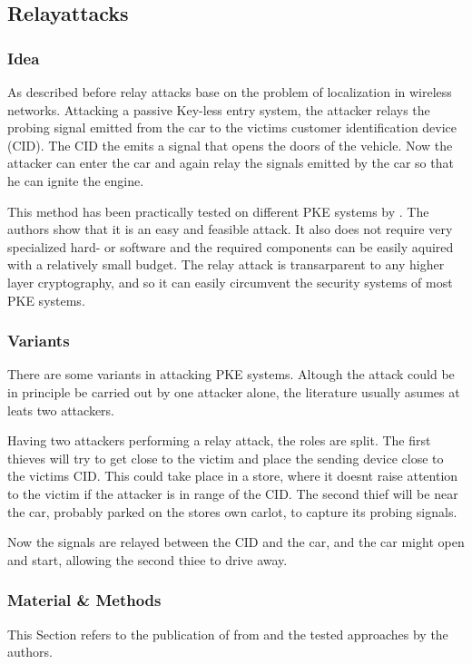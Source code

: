 
\subsection{Relayattacks}
\subsubsection*{Idea}
	As described before relay attacks base on the problem of localization in
	wireless networks.
	Attacking a passive Key-less entry system,
	the attacker relays the probing signal emitted from the car to the victims
	customer identification device (CID).
	The CID the emits a signal that opens the doors of the vehicle.
	Now the attacker can enter the car and again relay the signals emitted by the
	car so that he can ignite the engine.
	
	This method has been practically tested on different PKE systems by \cite{relayAttacksFranc}. %
	The authors show that it is an easy and feasible attack.
	It also does not require very specialized hard- or software and
	the required components can be easily aquired with a relatively small budget.
	The relay attack is transarparent to any higher layer cryptography,	%
	and so it can easily circumvent the security systems of most PKE systems.

\subsubsection*{Variants}
	There are some variants in attacking PKE systems.
	Altough the attack could be in principle be carried out by one attacker alone,
	the literature usually asumes at leats two attackers.

	\label{par:twoThieves}
	Having two attackers performing a relay attack,
	the roles are split.
	The first thieves will try to get close to the victim and place
	the sending device close to the victims CID.
	This could take place in a store,
	where it doesnt raise attention to the victim if the attacker
	is in range of the CID.
	The second thief will be near the car,
	probably parked on the stores own carlot,
	to capture its probing signals.

	Now the signals are relayed between the CID and the car,
	and the car might open and start,
	allowing the second thiee to drive away.

\subsubsection*{Material \& Methods}
	\label{sec:matmet}
	This Section refers to the publication of \citeauthor{relayAttacksFranc} from \citeyear{relayAttacksFranc}
	and the tested approaches by the authors.


